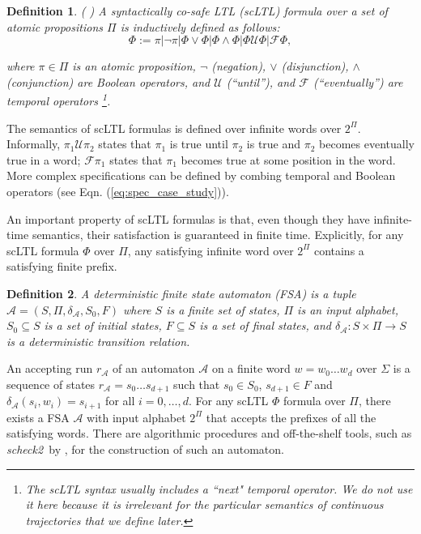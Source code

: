 \documentclass{ifacconf}
\newtheorem{definition}{Definition}
\newcommand{\AUTOMATON}{\ensuremath{\mathcal{A}}}
\newcommand{\LTLUNTIL}{\ensuremath{\mathcal{U}}}
\newcommand{\LTLEVENTUALLY}{\ensuremath{\mathcal{F}}}
\newcommand{\PREDSET}{\ensuremath{\Pi}}
\newcommand{\ARUN}{\ensuremath{r}}
\newcommand{\scheck}{\textit{scheck2\ }}
\begin{document}
\begin{definition}( \cite{Vardi:safety}) A syntactically co-safe LTL (scLTL) formula over a set of atomic propositions $\PREDSET$ is inductively defined as follows:
\begin{equation}
	\Phi := \pi | \neg \pi | \Phi \vee \Phi |  \Phi \wedge \Phi |  \Phi \LTLUNTIL \Phi | \LTLEVENTUALLY \Phi,
\end{equation}

where $\pi\in\Pi$ is an atomic proposition, $\neg$ (negation), $\vee$ (disjunction), $\wedge$ (conjunction) are Boolean operators, and $\LTLUNTIL$ (``until''), and $\LTLEVENTUALLY$ (``eventually'') are temporal operators \footnote{The scLTL syntax usually includes a ``next" temporal operator. We do not use it here 
because it is irrelevant for the particular semantics of continuous trajectories that we define later.}. 
\end{definition}

The semantics of scLTL formulas is defined over infinite words over $2^\PREDSET$. Informally, 
$\pi_1\LTLUNTIL \pi_2$ states that $\pi_1$ is true until $\pi_2$ is true and $\pi_2$ becomes eventually true in a word; $\LTLEVENTUALLY \pi_1$ states that $\pi_1$ becomes true at some position in the word. More complex specifications can be defined by combing temporal and Boolean operators (see Eqn. (\ref{eq:spec_case_study})). 

An important property of scLTL formulas is that, even though they have infinite-time semantics,
their satisfaction is guaranteed in finite time. Explicitly, for any scLTL formula $\Phi$ over $\PREDSET$,
any satisfying infinite word over $2^\PREDSET$ contains a satisfying finite prefix. 

\begin{definition} A deterministic finite state automaton (FSA) is a tuple $\AUTOMATON = (S, \Pi, \delta_\AUTOMATON, S_0, F)$ where $S$ is a finite set of states, $\Pi$ is an input alphabet, $S_0 \subseteq S$ is a set of initial states, $F \subseteq S$ is a set of final states, and $\delta_\AUTOMATON : S \times \Pi \longrightarrow S$ is a deterministic transition relation.
\end{definition}

An accepting run $\ARUN_\AUTOMATON$ of an automaton $\AUTOMATON$ on a finite word $w=w_0\ldots w_d$ over $\Sigma$ is a sequence of states $\ARUN_\AUTOMATON=s_0\ldots s_{d+1}$ such that $s_0 \in S_0$, $s_{d+1} \in F$ and $\delta_\AUTOMATON(s_i,w_i) = s_{i+1}$ for all $i=0,\ldots,d$. 
For any scLTL $\Phi$ formula over $\PREDSET$, there exists a FSA $\AUTOMATON$ with input alphabet $2^\PREDSET$ that accepts the prefixes of all the satisfying words. 
There are algorithmic procedures and off-the-shelf tools, such as \scheck by \cite{Latvala:scheck},
for the construction of such an automaton.
\end{document}
